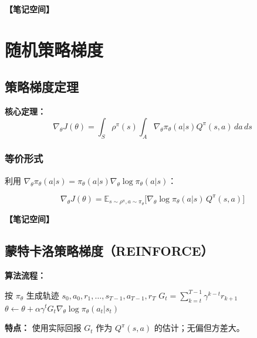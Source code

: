 \documentclass[12pt,a4paper]{article}
\newcommand{\notespace}[1][3cm]{%
  \vspace{#1}%
  \noindent\textbf{【笔记空间】}%
  \vspace{#1}%
}
\newcommand{\E}{\mathbb{E}}
\newcommand{\1}{\mathbf{1}}
\begin{document}
\notespace[3cm]

\newpage

\section{随机策略梯度}

\subsection{策略梯度定理}

\begin{keybox}
\textbf{核心定理：}
\begin{equation}
\nabla_\theta J(\theta)=\int_S\rho^{\pi}(s)\int_A\nabla_\theta\pi_\theta(a|s)Q^{\pi}(s,a)\,da\,ds
\end{equation}
\end{keybox}

\subsubsection*{等价形式}

利用 $\nabla_\theta\pi_\theta(a|s)=\pi_\theta(a|s)\nabla_\theta\log\pi_\theta(a|s)$：

\begin{equation}
\nabla_\theta J(\theta)=\E_{s\sim\rho^{\pi},a\sim\pi_\theta}\bigl[\nabla_\theta\log\pi_\theta(a|s)\,Q^{\pi}(s,a)\bigr]
\end{equation}

\notespace[2cm]

\subsection{蒙特卡洛策略梯度（REINFORCE）}

\textbf{算法流程：}

\begin{algorithmic}[1]
  \State 按 $\pi_\theta$ 生成轨迹 $s_0,a_0,r_1,\dots,s_{T-1},a_{T-1},r_T$
    \State $G_t=\sum_{k=t}^{T-1}\gamma^{k-t}r_{k+1}$
    \State $\theta\leftarrow\theta+\alpha\gamma^t G_t\nabla_\theta\log\pi_\theta(a_t|s_t)$
  \EndFor
\EndFor
\end{algorithmic}

\begin{notebox}
\textbf{特点：} 使用实际回报 $G_t$ 作为 $Q^{\pi}(s,a)$ 的估计；无偏但方差大。
\end{notebox}
\end{document}
